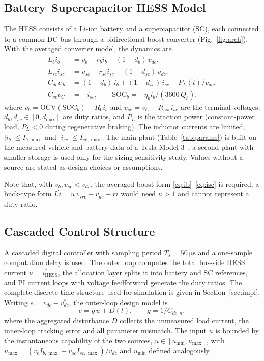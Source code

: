 \subsection{Battery--Supercapacitor HESS Model}
The HESS consists of a Li-ion battery and a supercapacitor (SC), each connected to a common DC bus through a bidirectional boost converter (Fig.~\ref{fig:arch}). With the averaged converter model, the dynamics are
\begin{align}
L_b \dot i_b &= v_b - r_b i_b - (1-d_b)\,v_{dc},\label{eq:ib}\\
L_{sc} \dot i_{sc} &= v_{sc} - r_{sc} i_{sc} - (1-d_{sc})\,v_{dc},\label{eq:isc}\\
C_{dc}\dot v_{dc} &= (1-d_b)\,i_b + (1-d_{sc})\,i_{sc} - P_L(t)/v_{dc},\label{eq:vdc}\\
C_{sc}\dot v_C &= -i_{sc},\qquad \dot{\mathrm{SOC}}_b = -\eta_b i_b/(3600\,Q_b),\label{eq:soc}
\end{align}
where $v_b=\mathrm{OCV}(\mathrm{SOC}_b)-R_0 i_b$ and $v_{sc}=v_C-R_{esr}i_{sc}$ are the terminal voltages, $d_b,d_{sc}\in[0,d_{\max}]$ are duty ratios, and $P_L$ is the traction power (constant-power load, $P_L<0$ during regenerative braking). The inductor currents are limited, $|i_b|\le I_{b,\max}$ and $|i_{sc}|\le I_{sc,\max}$. The main plant (Table~\ref{tab:params}) is built on the measured vehicle and battery data of a Tesla Model 3~\cite{rosenberger2024m3}; a second plant with smaller storage is used only for the sizing sensitivity study. Values without a source are stated as design choices or assumptions.

Note that, with $v_b, v_{sc} < v_{dc}$, the averaged boost form \eqref{eq:ib}--\eqref{eq:isc} is required; a buck-type form $L\dot i = u\,v_{src}-v_{dc}-ri$ would need $u>1$ and cannot represent a duty ratio.

\subsection{Cascaded Control Structure}
A cascaded digital controller with sampling period $T_s=\SI{50}{\micro\second}$ and a one-sample computation delay is used. The outer loop computes the total bus-side HESS current $u=i^*_{\mathrm{HESS}}$, the allocation layer splits it into battery and SC references, and PI current loops with voltage feedforward generate the duty ratios. The complete discrete-time structure used for simulation is given in Section~\ref{sec:impl}. Writing $e=v_{dc}-v^*_{dc}$, the outer-loop design model is
\begin{equation}
\dot e = g\,u + D(t),\qquad g = 1/C_{dc,n},\label{eq:edyn}
\end{equation}
where the aggregated disturbance $D$ collects the unmeasured load current, the inner-loop tracking error and all parameter mismatch. The input $u$ is bounded by the instantaneous capability of the two sources, $u\in[u_{\min},u_{\max}]$, with $u_{\max}=(v_bI_{b,\max}+v_{sc}I_{sc,\max})/v_{dc}$ and $u_{\min}$ defined analogously.

